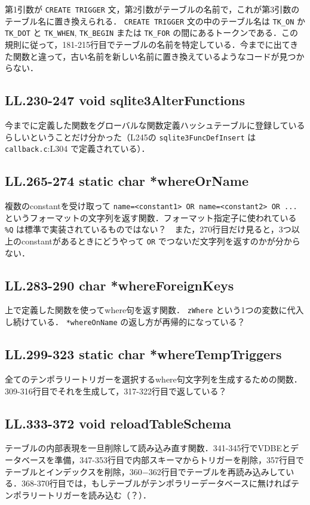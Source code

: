 \documentclass{ltjsarticle}
\begin{document}
第1引数が \verb~CREATE TRIGGER~ 文，第2引数がテーブルの名前で，これが第3引数のテーブル名に置き換えられる． \verb~CREATE TRIGGER~ 文の中のテーブル名は \verb~TK_ON~ か \verb~TK_DOT~ と \verb~TK_WHEN~, \verb~TK_BEGIN~ または \verb~TK_FOR~ の間にあるトークンである．この規則に従って，181-215行目でテーブルの名前を特定している．今までに出てきた関数と違って，古い名前を新しい名前に置き換えているようなコードが見つからない．

\subsection*{LL.230-247 void sqlite3AlterFunctions}
\label{sec-2-4}

今までに定義した関数をグローバルな関数定義ハッシュテーブルに登録しているらしいということだけ分かった（L245の \verb~sqlite3FuncDefInsert~ は \verb~callback.c~:L304 で定義されている）．

\subsection*{LL.265-274 static char *whereOrName}
\label{sec-2-5}

複数のconstantを受け取って \verb~name=<constant1> OR name=<constant2> OR ...~ というフォーマットの文字列を返す関数．フォーマット指定子に使われている \verb~%Q~ は標準で実装されているものではない？　また，270行目だけ見ると，3つ以上のconstantがあるときにどうやって \verb~OR~ でつないだ文字列を返すのかが分からない．

\subsection*{LL.283-290 char *whereForeignKeys}
\label{sec-2-6}

上で定義した関数を使ってwhere句を返す関数． \verb~zWhere~ という1つの変数に代入し続けている． \verb~*whereOnName~ の返し方が再帰的になっている？

\subsection*{LL.299-323 static char *whereTempTriggers}
\label{sec-2-7}

全てのテンポラリートリガーを選択するwhere句文字列を生成するための関数．309-316行目でそれを生成して，317-322行目で返している？

\subsection*{LL.333-372 void reloadTableSchema}
\label{sec-2-8}

テーブルの内部表現を一旦削除して読み込み直す関数．341-345行でVDBEとデータベースを準備，347-353行目で内部スキーマからトリガーを削除，357行目でテーブルとインデックスを削除，360−362行目でテーブルを再読み込みしている．368-370行目では，もしテーブルがテンポラリーデータベースに無ければテンポラリートリガーを読み込む（？）．
\end{document}

